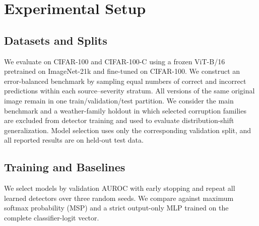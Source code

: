 \documentclass[11pt]{article}
\begin{document}


\section{Experimental Setup}

\subsection{Datasets and Splits}
We evaluate on CIFAR-100 and CIFAR-100-C using a frozen ViT-B/16
pretrained on ImageNet-21k and fine-tuned on CIFAR-100. We construct an error-balanced benchmark by sampling equal
numbers of correct and incorrect predictions within each
source--severity stratum. All versions of the same original
image remain in one train/validation/test partition. We consider
the main benchmark and a weather-family holdout in which selected
corruption families are excluded from detector training and used to
evaluate distribution-shift generalization. Model selection uses only
the corresponding validation split, and all reported results are on
held-out test data.

\subsection{Training and Baselines}
We select models by validation AUROC with early stopping and repeat
all learned detectors over three random seeds. We compare against
maximum softmax probability (MSP) and a strict output-only MLP trained
on the complete classifier-logit vector. 
\end{document}
